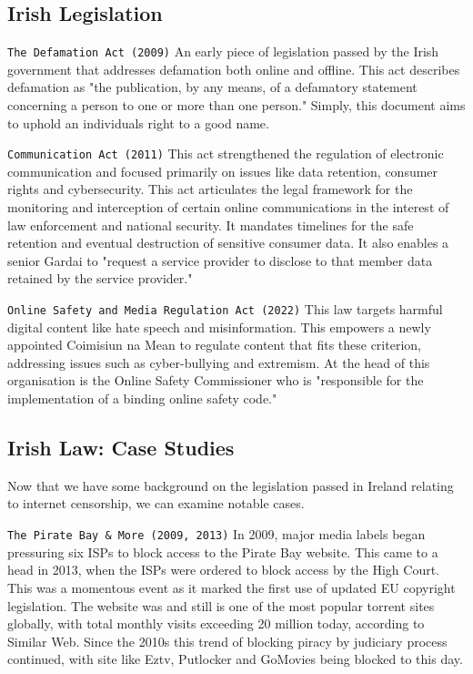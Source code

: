 \subsection{Irish Legislation}
\texttt{The Defamation Act (2009)}
An early piece of legislation passed by the Irish government that addresses defamation both online and offline. This act describes defamation as "the publication, by any means, of a defamatory statement concerning a person to one or more than one person." \cite{defamation2009} Simply, this document aims to uphold an individuals right to a good name.

\texttt{Communication Act (2011)}
This act strengthened the regulation of electronic communication and focused primarily on issues like data retention, consumer rights and cybersecurity. This act articulates the legal framework for the monitoring and interception of certain online communications in the interest of law enforcement and national security. It mandates timelines for the safe retention and eventual destruction of sensitive consumer data. It also enables a senior Gardai to "request a service provider to disclose to that member data retained by the service provider." \cite{communications2011}

\texttt{Online Safety and Media Regulation Act (2022)}
This law targets harmful digital content like hate speech and misinformation. This empowers a newly appointed Coimisiun na Mean to regulate content that fits these criterion, addressing issues such as cyber-bullying and extremism. At the head of this organisation is the Online Safety Commissioner who is "responsible for the implementation of a binding online safety code." \cite{onlinesafety2022}

\subsection{Irish Law: Case Studies}
Now that we have some background on the legislation passed in Ireland relating to internet censorship, we can examine notable cases. 

\texttt{The Pirate Bay \& More (2009, 2013)}
In 2009, major media labels began pressuring six ISPs to block access to the Pirate Bay website. This came to a head in 2013, when the ISPs were ordered to block access by the High Court. \cite{piratebay_block2013} This was a momentous event as it marked the first use of updated EU copyright legislation. The website was and still is one of the most popular torrent sites globally, with total monthly visits exceeding 20 million today, according to Similar Web. \cite{piratebay_stats2025} Since the 2010s this trend of blocking piracy by judiciary process continued, with site like Eztv, Putlocker and GoMovies being blocked to this day.

